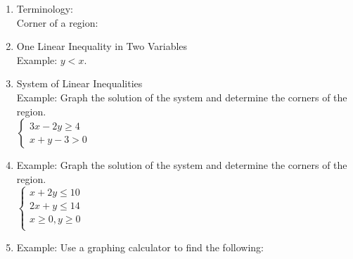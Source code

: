 \documentclass[12pt]{amsart}
\begin{document}
\begin{enumerate}

\item Terminology: \\

Corner of a region: \\

\item One Linear Inequality in Two Variables\\
Example: $y < x$.

\vspace{2in}

 
\item System of Linear Inequalities \\
Example: Graph the solution of the system and determine the corners of the region.\\
$ \begin{cases}
3x - 2y \geq 4 \\
x + y - 3 > 0

\end{cases}$
 \vspace{4in}
 \item Example: Graph the solution of the system and determine the corners of the region.\\
 
 $\begin{cases}
 
 x + 2y \leq 10 \\
 2x + y \leq 14 \\
 x \geq 0, y \geq 0\\
 
 \end{cases}$


\vspace{4in}
\item Example: Use a graphing calculator to find the following:
\end{enumerate}
\end{document}
